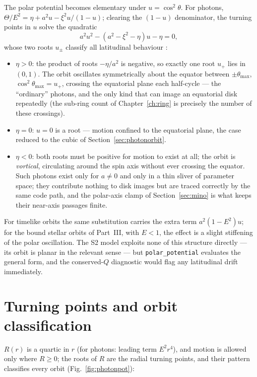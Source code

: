 The polar potential becomes elementary under $u = \cos^2\theta$. For
photons, $\Theta/E^2 = \eta + a^2u - \xi^2 u/(1-u)$; clearing the
$(1-u)$ denominator, the turning points in $u$ solve the quadratic
\begin{equation}
a^2 u^2 - \left(a^2 - \xi^2 - \eta\right)u - \eta = 0 ,
\label{eq:polarquad}
\end{equation}
whose two roots $u_\pm$ classify all latitudinal behaviour
\citep{Chandrasekhar1983, GrallaLupsasca2020}:
\begin{itemize}
\item $\eta > 0$: the product of roots $-\eta/a^2$ is negative, so
exactly one root $u_+$ lies in $(0, 1)$. The orbit oscillates
symmetrically about the equator between $\pm\theta_{\max}$,
$\cos^2\theta_{\max} = u_+$, crossing the equatorial plane each
half-cycle — the ``ordinary'' photons, and the only kind that can
image an equatorial disk repeatedly (the sub-ring count of
Chapter~\ref{ch:ring} is precisely the number of these crossings).
\item $\eta = 0$: $u = 0$ is a root — motion confined to the
equatorial plane, the case reduced to the cubic of
Section~\ref{sec:photonorbit}.
\item $\eta < 0$: both roots must be positive for motion to exist at
all; the orbit is \emph{vortical}, circulating around the spin axis
without ever crossing the equator. Such photons exist only for
$a \neq 0$ and only in a thin sliver of parameter space; they
contribute nothing to disk images but are traced correctly by the same
code path, and the polar-axis clamp of Section~\ref{sec:mino} is what
keeps their near-axis passages finite.
\end{itemize}
For timelike orbits the same substitution carries the extra term
$a^2(1 - E^2)u$; for the bound stellar orbits of Part~III, with
$E < 1$, the effect is a slight stiffening of the polar oscillation.
The S2 model exploits none of this structure directly — its orbit is
planar in the relevant sense — but \texttt{polar\_potential} evaluates
the general form, and the conserved-$Q$ diagnostic would flag any
latitudinal drift immediately.

\section{Turning points and orbit classification}
\label{sec:turningpoints}

$R(r)$ is a quartic in $r$ (for photons: leading term $E^2 r^4$), and
motion is allowed only where $R \geq 0$; the roots of $R$ are the radial
turning points, and their pattern classifies every orbit
(Fig.~\ref{fig:photonpot}):

